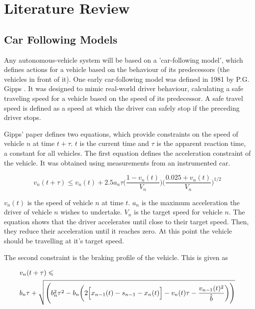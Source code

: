 \chapter{Literature Review}
\label{cha:Literature Review}

\section{Car Following Models}
\label{sec:Car Following Models}
Any autonomous-vehicle system will be based on a 'car-following model', which defines actions for a vehicle based on the behaviour of its predecessors (the vehicles in front of it). One early car-following model was defined in 1981 by P.G. Gipps \citep{Gipps1981}. It was designed to mimic real-world driver behaviour, calculating a safe traveling speed for a vehicle based on the speed of its predecessor. A safe travel speed is defined as a speed at which the driver can safely stop if the preceding driver stops.

Gipps' paper defines two equations, which provide constraints on the speed of vehicle $n$ at time $t + \tau$. $t$ is the current time and $\tau$ is the apparent reaction time, a constant for all vehicles. The first equation defines the acceleration constraint of the vehicle. It was obtained using measurements from an instrumented car.

\begin{equation}\label{Gipps1981Accel}
v_n(t+\tau) \leqslant v_n(t) + 2.5a_n\tau\Biggl(\frac{1 - v_n(t)}{V_n}\Biggr)\Biggl(\frac{0.025 + v_n(t)}{V_n}\Biggr)^{1/2}
\end{equation}

$v_n(t)$ is the speed of vehicle $n$ at time $t$. $a_n$ is the maximum acceleration the driver of vehicle $n$ wishes to undertake. $V_n$ is the target speed for vehicle $n$. The equation shows that the driver accelerates until close to their target speed. Then, they reduce their acceleration until it reaches zero. At this point the vehicle should be travelling at it's target speed.

The second constraint is the braking profile of the vehicle. This is given as

\begin{equation}\label{Gipps1981Brake}
\begin{split}
&v_n(t+\tau) \leqslant \\
&b_n\tau + \sqrt{\Biggl(b_n^2\tau^2 - b_n\biggl(2\Bigl[x_{n-1}(t) - s_{n-1} - x_n(t)\Bigr] - v_n(t)\tau - \frac{v_{n-1}(t)^2}{\hat{b}}\biggr)\Biggr)}
\end{split}
\end{equation}

